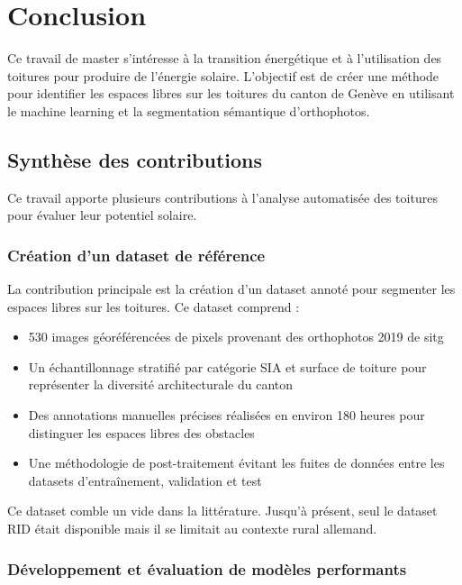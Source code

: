 \chapter{Conclusion}
\label{chap:conclusion}

Ce travail de master s'intéresse à la transition énergétique et à l'utilisation des toitures pour produire de l'énergie solaire. L'objectif est de créer une méthode pour identifier les espaces libres sur les toitures du canton de Genève en utilisant le machine learning et la segmentation sémantique d'orthophotos.


\localtableofcontents

\newpage

\section{Synthèse des contributions}

Ce travail apporte plusieurs contributions à l'analyse automatisée des toitures pour évaluer leur potentiel solaire.

\subsection{Création d'un dataset de référence}

La contribution principale est la création d'un dataset annoté pour segmenter les espaces libres sur les toitures. Ce dataset comprend :

\begin{itemize}
    \item 530 images géoréférencées de \si{} pixels provenant des orthophotos 2019 de \acrshort{sitg}
    \item Un échantillonnage stratifié par catégorie SIA et surface de toiture pour représenter la diversité architecturale du canton
    \item Des annotations manuelles précises réalisées en environ 180 heures pour distinguer les espaces libres des obstacles
    \item Une méthodologie de post-traitement évitant les fuites de données entre les datasets d'entraînement, validation et test
\end{itemize}

Ce dataset comble un vide dans la littérature. Jusqu'à présent, seul le dataset RID était disponible mais il se limitait au contexte rural allemand.

\subsection{Développement et évaluation de modèles performants}


